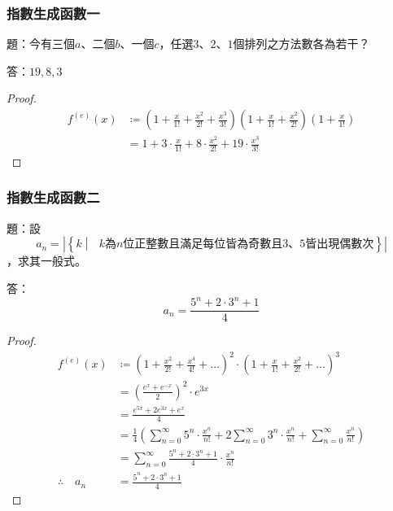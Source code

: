 \documentclass[a4paper,12pt]{article}
\begin{document}
\subsubsection{指數生成函數一}
題：今有三個$a$、二個$b$、一個$c$，任選$3$、$2$、$1$個排列之方法數各為若干？

答：$19, 8, 3$
\begin{proof}
\[
\begin{aligned}
f^{(e)}(x) &\coloneq (1+\frac{x}{1!}+\frac{x^2}{2!}+\frac{x^3}{3!})(1+\frac{x}{1!}+\frac{x^2}{2!})(1+\frac{x}{1!}) \\
&= 1+3\cdot\frac{x}{1!}+8\cdot\frac{x^2}{2!}+19\cdot\frac{x^3}{3!}
\end{aligned}
\]
\end{proof}
\subsubsection{指數生成函數二}
題：設
\[a_n=\left|\left\{k\middle|\text{\ $k$為$n$位正整數且滿足每位皆為奇數且$3$、$5$皆出現偶數次}\right\}\right|\]
，求其一般式。

答：
\[a_n= \frac{5^n+2\cdot 3^n+1}{4} \]
\begin{proof}
\[
\begin{aligned}
f^{\left(e\right)}\left(x\right) &\coloneq \left(1+\frac{x^2}{2!}+\frac{x^4}{4!}+\ldots\right)^2\cdot\left(1+\frac{x}{1!}+\frac{x^2}{2!}+\ldots\right)^3 \\
&= \left(\frac{e^x+e^{-x}}{2}\right)^2\cdot e^{3x} \\
&= \frac{e^{5x}+2e^{3x}+e^x}{4} \\
&= \frac{1}{4}\left(\sum_{n=0}^\infty 5^n\cdot \frac{x^n}{n!}+2\sum_{n=0}^\infty 3^n\cdot \frac{x^n}{n!}+\sum_{n=0}^\infty \frac{x^n}{n!}\right) \\
&= \sum_{n=0}^\infty \frac{5^n+2\cdot 3^n+1}{4}\cdot \frac{x^n}{n!} \\
\therefore\quad a_n &= \frac{5^n+2\cdot 3^n+1}{4}
\end{aligned}
\]
\end{proof}
\end{document}
